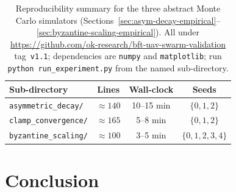 \documentclass[journal,10pt,twocolumn]{IEEEtran}
\begin{document}
\begin{table}[t]
\centering
\caption{Reproducibility summary for the three abstract Monte Carlo simulators (Sections~\ref{sec:asym-decay-empirical}--\ref{sec:byzantine-scaling-empirical}). All under \url{https://github.com/ok-research/bft-uav-swarm-validation} tag~\texttt{v1.1}; dependencies are \texttt{numpy} and \texttt{matplotlib}; run \texttt{python run\_experiment.py} from the named sub-directory.}
\label{tab:mc-reproducibility}
\footnotesize
\begin{tabular}{lccc}
\toprule
Sub-directory & Lines & Wall-clock & Seeds \\
\midrule
\texttt{asymmetric\_decay/}   & $\approx 140$ & 10--15 min & $\{0,1,2\}$ \\
\texttt{clamp\_convergence/}  & $\approx 165$ &  5--8 min  & $\{0,1,2\}$ \\
\texttt{byzantine\_scaling/}  & $\approx 100$ &  3--5 min  & $\{0,1,2,3,4\}$ \\
\bottomrule
\end{tabular}
\end{table}

\section{Conclusion}
\label{sec:conclusion}
\end{document}
